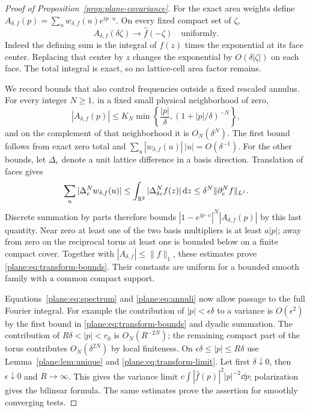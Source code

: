 \begin{proof}[Proof of Proposition~\ref{prop:plane-covariance}]
For the exact area weights define
$A_{\delta,f}(p)=\sum_uw_{\delta,f}(u)e^{ip\cdot u}$.
On every fixed compact set of $\zeta$,
\begin{equation}
 \label{plane:eq:transform-limit}
 A_{\delta,f}(\delta\zeta)\longrightarrow\widehat f(-\zeta)
 \quad\text{uniformly}.
\end{equation}
Indeed the defining sum is the integral of $f(z)$ times the
exponential at its face center.  Replacing that center by $z$
changes the exponential by $O(\delta|\zeta|)$ on each face.
The total integral is exact, so no lattice-cell area factor remains.

We record bounds that also control frequencies outside a fixed
rescaled annulus.  For every integer $N\ge1$, in a fixed small
physical neighborhood of zero,
\begin{equation}
 \label{plane:eq:transform-bounds}
 |A_{\delta,f}(p)|\le K_N
       \min\left\{\frac{|p|}{\delta},
                    (1+|p|/\delta)^{-N}\right\},
\end{equation}
and on the complement of that neighborhood it is $O_N(\delta^N)$.
The first bound follows from exact zero total and
$\sum_u|w_{\delta,f}(u)|\,|u|=O(\delta^{-1})$.
For the other bounds, let $\Delta_e$ denote a unit lattice difference
in a basis direction.  Translation of faces gives
\[
 \sum_u|\Delta_e^Nw_{\delta,f}(u)|
   \le\int_{\mathbb R^2}|\Delta_{\delta e}^N f(z)|\,\mathrm d z
   \le\delta^N\|\partial_e^N f\|_{L^1}.
\]
Discrete summation by parts therefore bounds
$|1-e^{ip\cdot e}|^N|A_{\delta,f}(p)|$ by this last quantity.
Near zero at least one of the two basis multipliers is at least
$a|p|$; away from zero on the reciprocal torus at least one is bounded
below on a finite compact cover.  Together with
$|A_{\delta,f}|\le\|f\|_1$, these estimates prove
\eqref{plane:eq:transform-bounds}.  Their constants are uniform for
a bounded smooth family with a common compact support.

Equations~\eqref{plane:eq:spectrum} and
\eqref{plane:eq:annuli} now allow passage to the full Fourier integral.
For example the contribution of $|p|<\epsilon\delta$ to a variance
is $O(\epsilon^2)$ by the first bound in
\eqref{plane:eq:transform-bounds} and dyadic summation.
The contribution of $R\delta<|p|<r_0$ is $O_N(R^{-2N})$;
the remaining compact part of the torus contributes $O_N(\delta^{2N})$
by local finiteness.  On $\epsilon\delta\le|p|\le R\delta$ use
Lemma~\ref{plane:lem:unique} and \eqref{plane:eq:transform-limit}.
Let first $\delta\downarrow0$, then $\epsilon\downarrow0$ and
$R\to\infty$.  This gives the variance limit
$c\int|\widehat f(p)|^2|p|^{-2}\dd p$; polarization gives the
bilinear formula.  The same estimates prove the assertion for
smoothly converging tests.


\end{proof}
